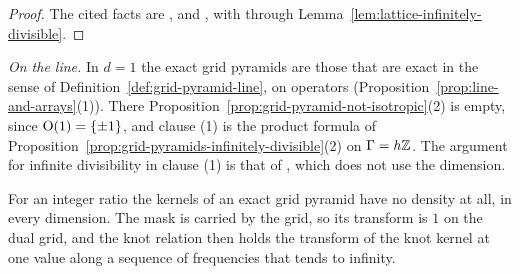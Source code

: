 \begin{proof}
The cited facts are
,  and , with  through
Lemma~\ref{lem:lattice-infinitely-divisible}.
\end{proof}

\emph{On the line.} In $d = 1$ the exact grid pyramids are those that are exact in the sense of
Definition~\ref{def:grid-pyramid-line}, on operators (Proposition~\ref{prop:line-and-arrays}(1)). There
Proposition~\ref{prop:grid-pyramid-not-isotropic}(2) is empty, since $\mathrm{O}(1) = \{\pm 1\}$, and
clause (1) is the product formula of Proposition~\ref{prop:grid-pyramids-infinitely-divisible}(2)
on $\Gamma = h\mathbb{Z}$. The argument for infinite divisibility in clause (1) is that of
, which does not use the dimension.

For an integer ratio the kernels of an exact grid pyramid have no density at all, in every
dimension. The mask is carried by the grid, so its transform is $1$ on the dual grid, and the knot
relation then holds the transform of the knot kernel at one value along a sequence of frequencies
that tends to infinity.

